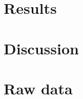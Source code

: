 \documentclass[]{report}
\begin{document}
\chapter{Results}

\chapter{Discussion}

\appendix
\chapter{Raw data}

%
%
%
%
%


\end{document}
